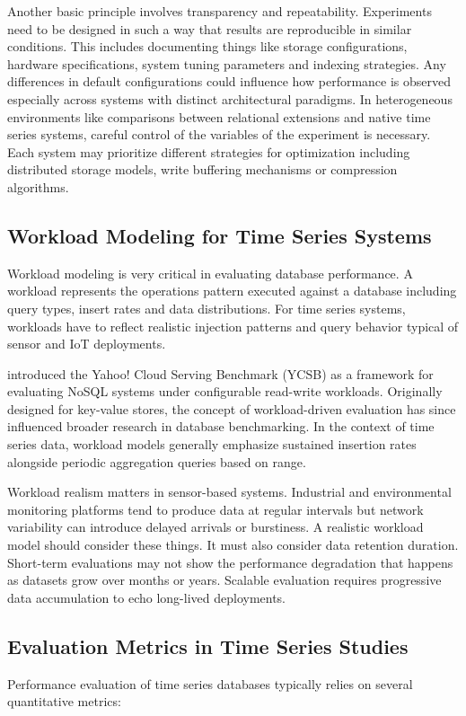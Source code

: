 Another basic principle involves transparency and repeatability. Experiments need to be designed in such a way that results are reproducible in similar conditions. This includes documenting things like storage configurations, hardware specifications, system tuning parameters and indexing strategies. Any differences in default configurations could influence how performance is observed especially across systems with distinct architectural paradigms. In heterogeneous environments like comparisons between relational extensions and native time series systems, careful control of the variables of the experiment is necessary. Each system may prioritize different strategies for optimization including distributed storage models, write buffering mechanisms or compression algorithms. 


\subsection{Workload Modeling for Time Series Systems}
Workload modeling is very critical in evaluating database performance. A workload represents the operations pattern executed against a database including query types, insert rates and data distributions. For time series systems, workloads have to reflect realistic injection patterns and query behavior typical of sensor and IoT deployments. 

\citet{Cooper_2010} introduced the Yahoo! Cloud Serving Benchmark (YCSB) as a framework for evaluating NoSQL systems under configurable read-write workloads. Originally designed for key-value stores, the concept of workload-driven evaluation has since influenced broader research in database benchmarking. In the context of time series data, workload models generally emphasize sustained insertion rates alongside periodic aggregation queries based on range.

Workload realism matters in sensor-based systems. Industrial and environmental monitoring platforms tend to produce data at regular intervals but network variability can introduce delayed arrivals or burstiness. A realistic workload model should consider these things. It must also consider data retention duration. Short-term evaluations may not show the performance degradation that happens as datasets grow over months or years. Scalable evaluation requires progressive data accumulation to echo long-lived deployments. 


\subsection{Evaluation Metrics in Time Series Studies}
Performance evaluation of time series databases typically relies on several quantitative metrics:


